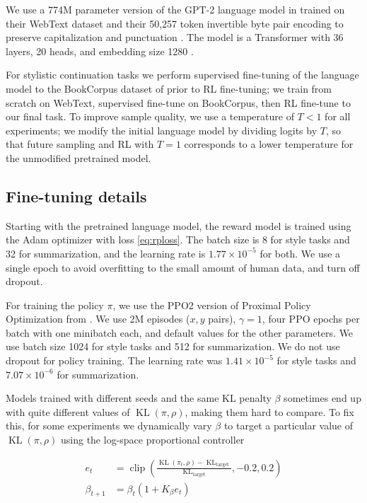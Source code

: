 We use a 774M parameter version of the GPT-2 language model in \citet{radford2019language} trained on their WebText dataset and their 50,257 token invertible byte pair encoding to preserve capitalization and punctuation \citep{sennrich2015neural}.  The model is a Transformer with 36 layers, 20 heads, and embedding size 1280 \citep{vaswani2017attention}. 

For stylistic continuation tasks we perform supervised fine-tuning of the language model to the BookCorpus dataset of \citet{zhu2015aligning} prior to RL fine-tuning; we train from scratch on WebText, supervised fine-tune on BookCorpus, then RL fine-tune to our final task.  To improve sample quality, we use a temperature of $T < 1$ for all experiments; we modify the initial language model by dividing logits by $T$, so that future sampling and RL with $T = 1$ corresponds to a lower temperature for the unmodified pretrained model.

\subsection{Fine-tuning details \label{sec:fine-tune}}

Starting with the pretrained language model, the reward model is trained using the Adam optimizer \citep{kingma2014adam} with loss \ref{eq:rploss}.  The batch size is 8 for style tasks and 32 for summarization, and the learning rate is $1.77\times 10^{-5}$ for both.  We use a single epoch to avoid overfitting to the small amount of human data, and turn off dropout.

For training the policy $\pi$, we use the PPO2 version of Proximal Policy Optimization from \citet{baselines}.  We use 2M episodes ($x,y$ pairs), $\gamma = 1$, four PPO epochs per batch with one minibatch each, and default values for the other parameters.  We use batch size 1024 for style tasks and 512 for summarization. We do not use dropout for policy training. The learning rate was $1.41\times 10^{-5}$ for style tasks and $7.07\times 10^{-6}$ for summarization.

Models trained with different seeds and the same KL penalty $\beta$ sometimes end up with quite different values of $\operatorname{KL}(\pi, \rho)$, making them hard to compare.  To fix this, for some experiments we dynamically vary $\beta$ to target a particular value of $\operatorname{KL}(\pi, \rho)$ using the log-space proportional controller

\begin{align*}
    e_t &= \operatorname{clip}\left(\frac{\operatorname{KL}(\pi_t, \rho) - \operatorname{KL}_{\mathrm{target}}}{\operatorname{KL}_{\mathrm{target}}}, -0.2, 0.2\right) \\
    \beta_{t+1} &= \beta_t( 1 + K_\beta e_t )
\end{align*}

